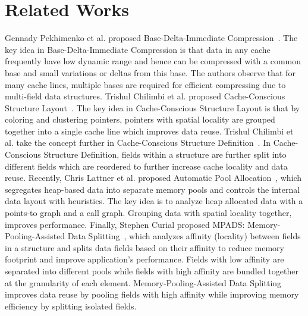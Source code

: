 \section{Related Works}
\label{sec:rel}

Gennady Pekhimenko et al. proposed Base-Delta-Immediate Compression~\cite{bdi}. The key
idea in Base-Delta-Immediate Compression is that data in any cache frequently
have low dynamic range and hence can be compressed with a common base and small
variations or deltas from this base. The authors observe that for many cache
lines, multiple bases are required for efficient compressing due to multi-field
data structures. Trishul Chilimbi et al. proposed Cache-Conscious Structure
Layout~\cite{cache-layout}. The key idea in Cache-Conscious Structure Layout is that by coloring
and clustering pointers, pointers with spatial locality are grouped together
into a single cache line which improves data reuse. Trishul Chilimbi et al. take
the concept further in Cache-Conscious Structure Definition~\cite{cache-def}. In
Cache-Conscious Structure Definition, fields within a structure are further
split into different fields which are reordered to further increase cache
locality and data reuse. Recently, Chris Lattner et al. proposed Automatic Pool
Allocation~\cite{lattner1}, which segregates heap-based data into separate memory pools and
controls the internal data layout with heuristics. The key idea is to analyze
heap allocated data with a points-to graph and a call graph. Grouping data with
spatial locality together, improves performance. Finally, Stephen Curial
proposed MPADS: Memory-Pooling-Assisted Data Splitting~\cite{mpads}, which analyzes
affinity (locality) between fields in a structure and splits data fields based
on their affinity to reduce memory footprint and improve application’s
performance. Fields with low affinity are separated into different pools while
fields with high affinity are bundled together at the granularity of each
element. Memory-Pooling-Assisted Data Splitting improves data reuse by pooling
fields with high affinity while improving memory efficiency by splitting
isolated fields.
